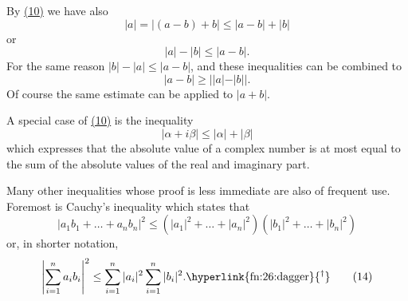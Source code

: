 By \hyperref[eq:1.10]{(10)} we have also
\begin{equation*}
| a | = | (a - b) + b | \leq | a - b | + | b |
\end{equation*}
or
\begin{equation*}
| a | - | b | \leq | a - b |.
\end{equation*}
For the same reason $|b| - |a| \leq |a - b|$, and these inequalities can be combined to
\begin{equation*}
| a - b | \geq | | a | - | b | |.\tag{12}\label{eq:1.12}
\end{equation*}
Of course the same estimate can be applied to $|a + b|$.

A special case of \hyperref[eq:1.10]{(10)} is the inequality
\begin{equation*}
| \alpha + i \beta | \leq | \alpha | + | \beta |\tag{13}\label{eq:1.13}
\end{equation*}
which expresses that the absolute value of a complex number is at most equal to the sum of the absolute values of the real and imaginary part.

Many other inequalities whose proof is less immediate are also of frequent use. Foremost is Cauchy's inequality which states that
\begin{equation*}
\left| a _ {1} b _ {1} + \dots + a _ {n} b _ {n} \right| ^ {2} \leq \left(\left| a _ {1} \right| ^ {2} + \dots + \left| a _ {n} \right| ^ {2}\right) \left(\left| b _ {1} \right| ^ {2} + \dots + \left| b _ {n} \right| ^ {2}\right)
\end{equation*}
or, in shorter notation,
\begin{equation*}
\left| \sum_ {i = 1} ^ {n} a _ {i} b _ {i} \right| ^ {2} \leq \sum_ {i = 1} ^ {n} | a _ {i} | ^ {2} \sum_ {i = 1} ^ {n} | b _ {i} | ^ {2}. \text{\hyperlink{fn:26:dagger}{\textsuperscript{\ensuremath{\dagger}}}}\tag{14}\label{eq:1.14}
\end{equation*}
\begingroup\renewcommand{\thefootnote}{}\endgroup

